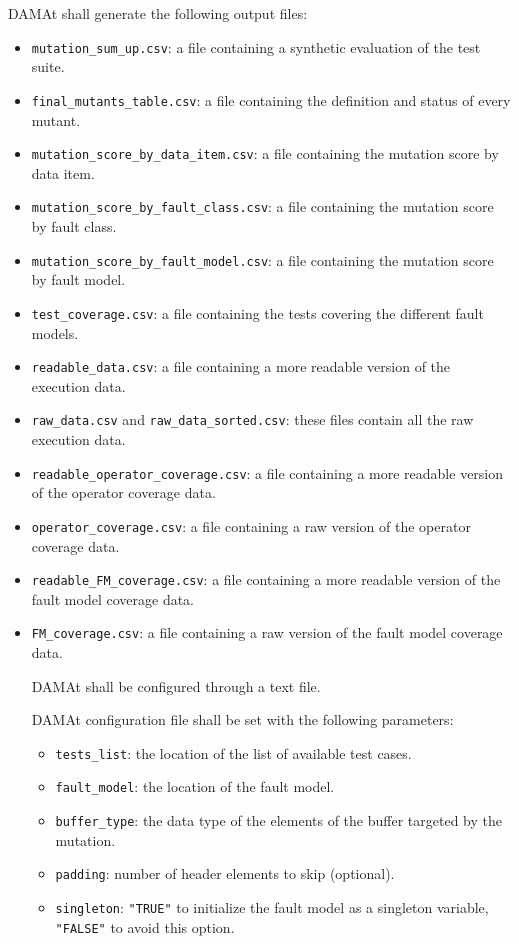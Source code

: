 \RQ{} DAMAt shall generate the following output files:
	\begin{itemize}
		\item \texttt{mutation\_sum\_up.csv}: a file containing a synthetic evaluation of the test suite.
		\item \texttt{final\_mutants\_table.csv}: a file containing the definition and status of every mutant.
		\item \texttt{mutation\_score\_by\_data\_item.csv}: a file containing the mutation score by data item.
		\item \texttt{mutation\_score\_by\_fault\_class.csv}: a file containing the mutation score by fault class.
		\item \texttt{mutation\_score\_by\_fault\_model.csv}: a file containing the mutation score by fault model.
		\item \texttt{test\_coverage.csv}: a file containing the tests covering the different fault models.
		\item \texttt{readable\_data.csv}: a file containing a more readable version of the execution data.
		\item \texttt{raw\_data.csv} and \texttt{raw\_data\_sorted.csv}: these files contain all the raw execution data.
		\item \texttt{readable\_operator\_coverage.csv}: a file containing a more readable version of the operator coverage data.
		\item \texttt{operator\_coverage.csv}: a file containing a raw version of the operator coverage data.
		\item \texttt{readable\_FM\_coverage.csv}: a file containing a more readable version of the fault model coverage data.
		\item \texttt{FM\_coverage.csv}: a file containing a raw version of the fault model coverage data.

\RQ{} DAMAt shall be configured through a text file.

\RQ{} DAMAt configuration file shall be set with the following parameters:
	\begin{itemize}
		\item \texttt{tests\_list}: the location of the list of available test cases.
		\item \texttt{fault\_model}: the location of the fault model.
		\item \texttt{buffer\_type}: the data type of the elements of the buffer targeted by the mutation.
		\item \texttt{padding}: number of header elements to skip (optional).
		\item \texttt{singleton}: \texttt{"TRUE"} to initialize the fault model as a singleton variable, \texttt{"FALSE"} to avoid this option.
	\end{itemize}


\end{itemize}
